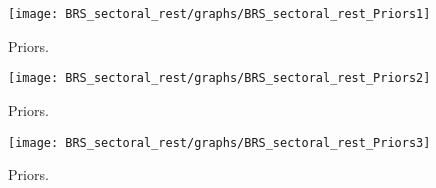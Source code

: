  
\begin{figure}[H]
\centering
\texttt{[image: BRS\_sectoral\_rest/graphs/BRS\_sectoral\_rest\_Priors1]}
\caption{Priors.}\label{Fig:Priors:1}
\end{figure}
\begin{figure}[H]
\centering
\texttt{[image: BRS\_sectoral\_rest/graphs/BRS\_sectoral\_rest\_Priors2]}
\caption{Priors.}\label{Fig:Priors:2}
\end{figure}
\begin{figure}[H]
\centering
\texttt{[image: BRS\_sectoral\_rest/graphs/BRS\_sectoral\_rest\_Priors3]}
\caption{Priors.}\label{Fig:Priors:3}
\end{figure}
 
